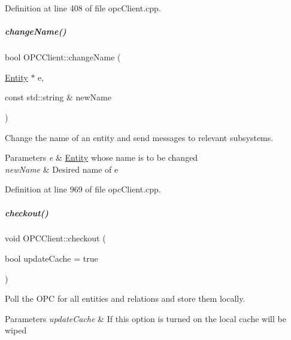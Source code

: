 Definition at line 408 of file opc\+Client.\+cpp.

\mbox{\label{group__icubclient__clients_a0b4c570e07720cc25c203eda14adda99}} 
\subparagraph{\texorpdfstring{change\+Name()}{changeName()}}
{\footnotesize\ttfamily bool O\+P\+C\+Client\+::change\+Name (\begin{DoxyParamCaption}\item[{\hyperlink{group__icubclient__representations_classicubclient_1_1Entity}{Entity} $\ast$}]{e,  }\item[{const std\+::string \&}]{new\+Name }\end{DoxyParamCaption})\hspace{0.3cm}{\ttfamily [protected]}}



Change the name of an entity and send messages to relevant subsystems. 


\begin{DoxyParams}{Parameters}
{\em e} & \hyperlink{group__icubclient__representations_classicubclient_1_1Entity}{Entity} whose name is to be changed \\
\hline
{\em new\+Name} & Desired name of e \\
\hline
\end{DoxyParams}


Definition at line 969 of file opc\+Client.\+cpp.

\mbox{\label{group__icubclient__clients_a5a5bedfa32b8adba9a6ecf1d69745dc5}} 
\subparagraph{\texorpdfstring{checkout()}{checkout()}}
{\footnotesize\ttfamily void O\+P\+C\+Client\+::checkout (\begin{DoxyParamCaption}\item[{bool}]{update\+Cache = {\ttfamily true} }\end{DoxyParamCaption})}



Poll the O\+PC for all entities and relations and store them locally. 


\begin{DoxyParams}{Parameters}
{\em update\+Cache} & If this option is turned on the local cache will be wiped \\
\hline
\end{DoxyParams}


